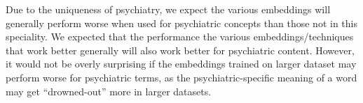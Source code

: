 \documentclass[10pt]{article}
\begin{document}
Due to the uniqueness of psychiatry, we expect the various embeddings will generally perform worse when used for psychiatric concepts than those not in this speciality. We expected that the performance the various embeddings/techniques that work better generally will also work better for psychiatric content. However, it would not be overly surprising if the embeddings trained on larger dataset may perform worse for psychiatric terms, as the psychiatric-specific meaning of a word may get ``drowned-out'' more in larger datasets. 
%
%
%
%
%
%
%
%
\end{document}
